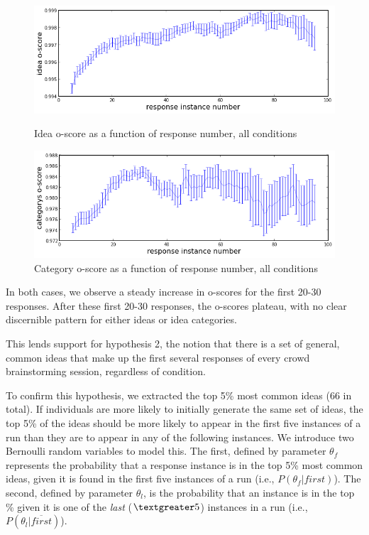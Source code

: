\begin{figure}[h]
    \centering
    \includegraphics[width=0.9\columnwidth]{idea_oscore_order}
    \caption{Idea o-score as a function of response number, all conditions}
    \label{fig:idea_oscore_order}
    \includegraphics[width=0.9\columnwidth]{cat_oscore_order}
    \caption{Category o-score as a function of response number, all conditions}
    \label{fig:cat_oscore_order}
\end{figure}

In both cases, we observe a steady increase in o-scores for the first 20-30 responses. After these first 20-30 responses, the o-scores plateau, with no clear discernible pattern for either ideas or idea categories.

This lends support for hypothesis 2, the notion that there is a set of general, common ideas that make up the first several responses of every crowd brainstorming session, regardless of condition.

To confirm this hypothesis, we extracted the top 5\% most common ideas (66 in total). If individuals are more likely to initially generate the same set of ideas, the top 5\% of the ideas should be more likely to appear in the first five instances of a run than they are to appear in any of the following instances. We introduce two Bernoulli random variables to model this. The first, defined by parameter $\theta_f$ represents the probability that a response instance is in the top 5\% most common ideas, given it is found in the first five instances of a run (i.e., $P(\theta_f|first)$). The second, defined by parameter $\theta_l$, is the probability that an instance is in the top \% given it is one of the \emph{last} ($\textgreater5$) instances in a run (i.e., $P(\theta_l|\overline{first})$).

